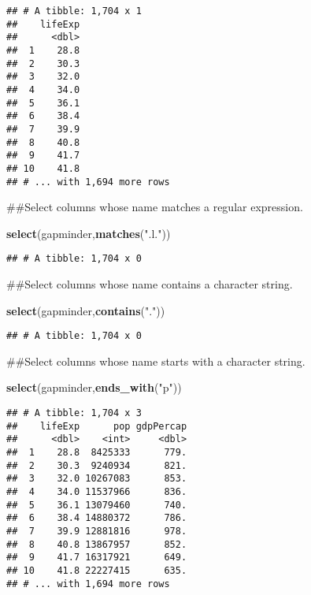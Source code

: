 \documentclass[]{article}
\newenvironment{Shaded}{\begin{snugshade}}{\end{snugshade}}
\newcommand{\KeywordTok}[1]{\textcolor[rgb]{0.13,0.29,0.53}{\textbf{#1}}}
\newcommand{\NormalTok}[1]{#1}
\newcommand{\StringTok}[1]{\textcolor[rgb]{0.31,0.60,0.02}{#1}}
\begin{document}
\begin{verbatim}
## # A tibble: 1,704 x 1
##    lifeExp
##      <dbl>
##  1    28.8
##  2    30.3
##  3    32.0
##  4    34.0
##  5    36.1
##  6    38.4
##  7    39.9
##  8    40.8
##  9    41.7
## 10    41.8
## # ... with 1,694 more rows
\end{verbatim}

\begin{Shaded}
\begin{Highlighting}[]
\NormalTok{##Select columns whose name matches a regular expression. }

\KeywordTok{select}\NormalTok{(gapminder,}\KeywordTok{matches}\NormalTok{(}\StringTok{".l."}\NormalTok{))}
\end{Highlighting}
\end{Shaded}

\begin{verbatim}
## # A tibble: 1,704 x 0
\end{verbatim}

\begin{Shaded}
\begin{Highlighting}[]
\NormalTok{##Select columns whose name contains a character string. }

\KeywordTok{select}\NormalTok{(gapminder,}\KeywordTok{contains}\NormalTok{(}\StringTok{"."}\NormalTok{))}
\end{Highlighting}
\end{Shaded}

\begin{verbatim}
## # A tibble: 1,704 x 0
\end{verbatim}

\begin{Shaded}
\begin{Highlighting}[]
\NormalTok{##Select columns whose name starts with a character string. }

\KeywordTok{select}\NormalTok{(gapminder,}\KeywordTok{ends_with}\NormalTok{(}\StringTok{"p"}\NormalTok{))}
\end{Highlighting}
\end{Shaded}

\begin{verbatim}
## # A tibble: 1,704 x 3
##    lifeExp      pop gdpPercap
##      <dbl>    <int>     <dbl>
##  1    28.8  8425333      779.
##  2    30.3  9240934      821.
##  3    32.0 10267083      853.
##  4    34.0 11537966      836.
##  5    36.1 13079460      740.
##  6    38.4 14880372      786.
##  7    39.9 12881816      978.
##  8    40.8 13867957      852.
##  9    41.7 16317921      649.
## 10    41.8 22227415      635.
## # ... with 1,694 more rows
\end{verbatim}
\end{document}
